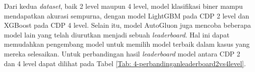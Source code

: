 \begin{table}[!ht]
	\centering
	\caption{Hasil pembuatan model multi fitur pada \emph{dataset} CDP 4 level}
	\vspace{0.5em}
	\label{Tab: 4-hasilmodel4level}
\end{table}

Dari kedua \emph{dataset}, baik 2 level maupun 4 level, model klasifikasi biner mampu mendapatkan akurasi sempurna, dengan model LightGBM pada CDP 2 level dan
XGBoost pada CDP 4 level. Selain itu, model AutoGluon juga mencoba beberapa model lain yang telah diurutkan menjadi sebuah \emph{leaderboard}. Hal ini dapat
memudahkan pengembang model untuk memilih model terbaik dalam kasus yang mereka selesaikan. Untuk perbandingan hasil \emph{leaderboard} model antara CDP 2 dan
4 level dapat dilihat pada Tabel \ref{Tab: 4-perbandinganleaderboard2vs4level}.

